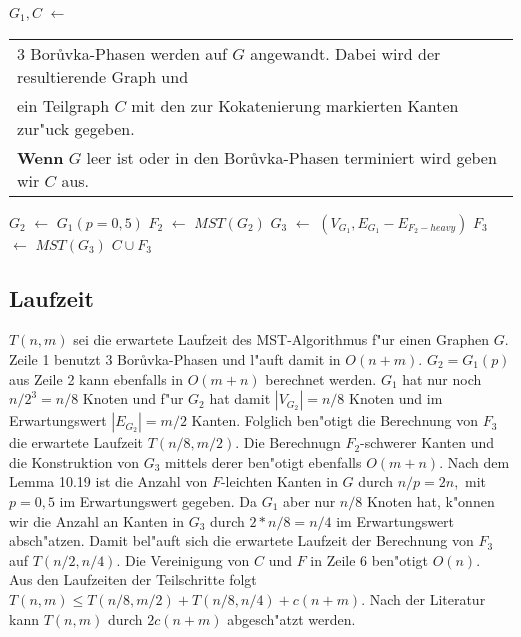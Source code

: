 \begin{algorithm}
\begin{algorithmic}[1]
    \STATE $G_1, C$ $\leftarrow$\begin{tabular}[H]{l}
                                 3 Bor\r uvka-Phasen werden auf $G$ angewandt.
                                 Dabei wird der resultierende Graph und\\
                                 ein Teilgraph $C$ mit den zur
                                 Kokatenierung markierten Kanten zur"uck gegeben.\\
                                 \textbf{Wenn} $G$ leer ist oder in den Bor\r uvka-Phasen
                                 terminiert wird geben wir $C$ aus.\\
                                 \end{tabular}
    \STATE $G_2$ $\leftarrow$ $G_1(p=0,5)$
    \STATE $F_2$ $\leftarrow$ $MST(G_2)$
    \STATE $G_3$ $\leftarrow$ $(V_{G_1}, E_{G_1} - E_{F_2-heavy})$
    \STATE $F_3$ $\leftarrow$ $MST(G_3)$
    \RETURN $C \cup F_3$
\end{algorithmic}
\end{algorithm}

\subsection{Laufzeit}

$T(n,m)$ sei die erwartete Laufzeit des MST-Algorithmus f"ur einen Graphen $G$.
    Zeile 1 benutzt 3 Bor\r uvka-Phasen und  l"auft damit in $O(n+m)$. 
    $G_2 = G_1(p)$ aus Zeile 2 kann ebenfalls in $O(m + n)$ berechnet werden.
    $G_1$ hat nur noch $n/2^3 = n/8$ Knoten und f"ur $G_2$ hat damit 
    $|V_{G_2}| = n/8$ Knoten und im Erwartungswert $|E_{G_2}| = m/2$ Kanten.
    Folglich ben"otigt die Berechnung von $F_3$  die erwartete Laufzeit 
    $T(n/8,m/2)$.
    Die Berechnugn $F_2$-schwerer Kanten und die Konstruktion von $G_3$ mittels
    derer ben"otigt ebenfalls $O(m+n)$.
    Nach dem Lemma 10.19 \cite{randAlg} ist die Anzahl von $F$-leichten Kanten in $G$ durch
    $n/p = 2n,$ mit $p = 0,5$ im Erwartungswert gegeben. Da $G_1$
    aber nur $n/8$ Knoten hat, k"onnen wir die Anzahl an Kanten in $G_3$
    durch $2*n/8 = n/4$ im Erwartungswert absch"atzen.
    Damit bel"auft sich die erwartete Laufzeit der Berechnung von $F_3$ auf
    $T(n/2, n/4)$.
    Die Vereinigung von $C$ und $F$ in Zeile 6 ben"otigt $O(n)$.\\
Aus den Laufzeiten der Teilschritte folgt
    $T(n,m) \leq T(n/8, m/2) + T(n/8, n/4) + c(n+m)$.
    Nach der Literatur kann $T(n,m)$ durch $2c(n+m)$ abgesch"atzt werden.
    \\
